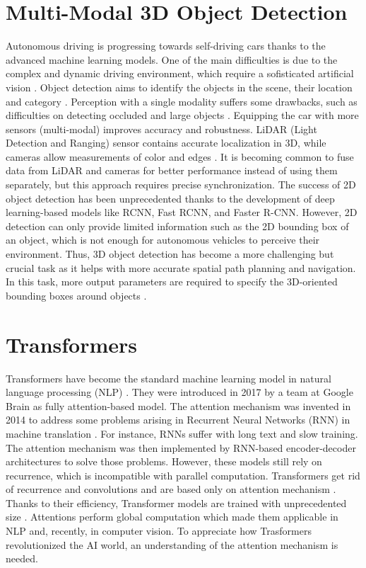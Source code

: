 \section{Multi-Modal 3D Object Detection}
Autonomous driving is progressing towards self-driving cars thanks to the advanced machine learning models. One of the main difficulties is due to the complex and dynamic driving environment, which require a sofisticated artificial vision \cite{wang2021multi}. Object detection aims to identify the objects in the scene, their location and category \cite{wang2021multi}. Perception with a single modality suffers some drawbacks, such as difficulties on detecting occluded and large objects \cite{huang2022multi}\cite{caesar2020nuscenes}. Equipping the car with more sensors (multi-modal) improves accuracy and robustness. LiDAR (Light Detection and Ranging) sensor contains accurate localization in 3D, while cameras allow measurements of color and edges \cite{caesar2020nuscenes}. It is becoming common to fuse data from LiDAR and cameras for better performance instead of using them separately, but this approach requires precise synchronization.
The success of 2D object detection has been unprecedented thanks to the development of deep learning-based models like RCNN, Fast RCNN, and Faster R-CNN. However, 2D detection can only provide limited information such as the 2D bounding box of an object, which is not enough for autonomous vehicles to perceive their environment. Thus, 3D object detection has become a more challenging but crucial task as it helps with more accurate spatial path planning and navigation. In this task, more output parameters are required to specify the 3D-oriented bounding boxes around objects \cite{wang2021multi}.



\section{Transformers}
Transformers have become the standard machine learning model in natural language processing (NLP) \cite{dosovitskiy2020image}. They were introduced in 2017 by a team at Google Brain \cite{Att.2017} as fully attention-based model. The attention mechanism was invented in 2014 to address some problems arising in Recurrent Neural Networks (RNN) in machine translation \cite{bahdanau2014neural}. For instance, RNNs suffer with long text and slow training. The attention mechanism was then implemented by RNN-based encoder-decoder architectures to solve those problems. However, these models still rely on recurrence, which is incompatible with parallel computation. Transformers get rid of recurrence and convolutions and are based only on attention mechanism \cite{Att.2017}. Thanks to their efficiency, Transformer models are trained with unprecedented size \cite{dosovitskiy2020image}. Attentions perform global computation which made them applicable in NLP and, recently, in computer vision. To appreciate how Trasformers revolutionized the AI world, an understanding of the attention mechanism is needed.


